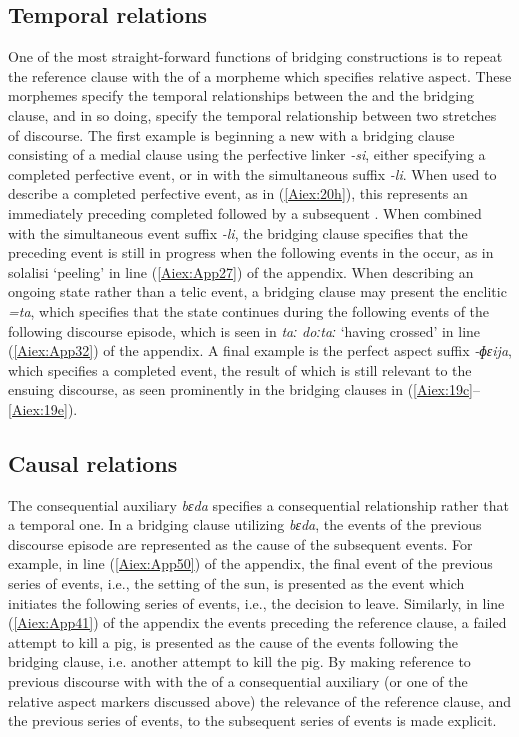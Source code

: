 \documentclass[output=paper]{LSP/langsci}
\begin{document}
\subsection{Temporal relations} 
\label{AiTemporal}
One of the most straight-forward functions of bridging constructions is to repeat the reference clause with the  of a morpheme which specifies relative aspect. These morphemes specify the temporal relationships between the  and the bridging clause, and in so doing, specify the temporal relationship between two stretches of discourse. The first example is beginning a new  with a bridging clause consisting of a medial clause using the perfective linker \textit{-si}, either specifying a completed perfective event, or in  with the simultaneous  suffix \textit{-li}. When used to describe a completed perfective event, as in (\ref{Aiex:20h}), this represents an immediately preceding completed  followed by a subsequent . When combined with the simultaneous event suffix \textit{-li}, the bridging clause specifies that the preceding event is still in progress when the following events in the  occur, as in solalisi `peeling' in line (\ref{Aiex:App27}) of the appendix. When describing an ongoing state rather than a telic event, a bridging clause may present the enclitic \textit{=ta}, which specifies that the state continues during the following events of the following discourse episode, which is seen in \textit{taː doːtaː} `having crossed' in line (\ref{Aiex:App32}) of the appendix. A final example is the perfect aspect suffix \textit{-ɸɛija}, which specifies a completed event, the result of which is still relevant to the ensuing discourse, as seen prominently in the bridging clauses in (\ref{Aiex:19c}--\ref{Aiex:19e}).

\subsection{Causal relations} 
\label{AiCausal}
The consequential auxiliary \textit{bɛda} specifies a consequential relationship rather that a temporal one. In a bridging clause utilizing \textit{bɛda}, the events of the previous discourse episode are represented as the cause of the subsequent events. For example, in line (\ref{Aiex:App50}) of the appendix, the final event of the previous series of events, i.e., the setting of the sun, is presented as the event which initiates the following series of events, i.e., the decision to leave. Similarly, in line (\ref{Aiex:App41}) of the appendix the events preceding the reference clause, a failed attempt to kill a pig, is presented as the cause of the events following the bridging clause, i.e. another attempt to kill the pig. By making reference to previous discourse with  with the  of a consequential auxiliary (or one of the relative aspect markers discussed above) the relevance of the reference clause, and the previous series of events, to the subsequent series of events is made explicit.
	
\end{document}
